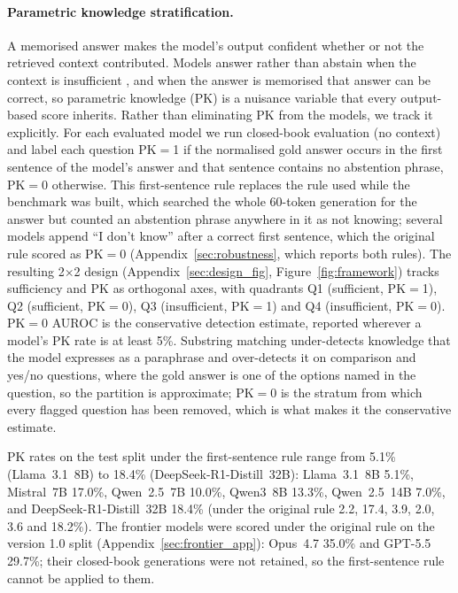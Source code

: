 \documentclass[acmsmall,screen,review]{acmart}
\begin{document}
\paragraph{Parametric knowledge stratification.}
A memorised answer makes the model's output confident whether or not the retrieved context contributed. Models answer rather than abstain when the context is insufficient \citep{joren2025sufficient}, and when the answer is memorised that answer can be correct, so parametric knowledge (PK) is a nuisance variable that every output-based score inherits. Rather than eliminating PK from the models, we track it explicitly. For each evaluated model we run closed-book evaluation (no context) and label each question PK$=$1 if the normalised gold answer occurs in the first sentence of the model's answer and that sentence contains no abstention phrase, PK$=$0 otherwise. This first-sentence rule replaces the rule used while the benchmark was built, which searched the whole 60-token generation for the answer but counted an abstention phrase anywhere in it as not knowing; several models append ``I don't know'' after a correct first sentence, which the original rule scored as PK$=$0 (Appendix~\ref{sec:robustness}, which reports both rules). The resulting 2$\times$2 design (Appendix~\ref{sec:design_fig}, Figure~\ref{fig:framework}) tracks sufficiency and PK as orthogonal axes, with quadrants Q1 (sufficient, PK$=$1), Q2 (sufficient, PK$=$0), Q3 (insufficient, PK$=$1) and Q4 (insufficient, PK$=$0). PK$=$0 AUROC is the conservative detection estimate, reported wherever a model's PK rate is at least 5\%. Substring matching under-detects knowledge that the model expresses as a paraphrase and over-detects it on comparison and yes/no questions, where the gold answer is one of the options named in the question, so the partition is approximate; PK$=$0 is the stratum from which every flagged question has been removed, which is what makes it the conservative estimate.

PK rates on the test split under the first-sentence rule range from 5.1\% (Llama~3.1~8B) to 18.4\% (DeepSeek-R1-Distill~32B): Llama~3.1~8B 5.1\%, Mistral~7B 17.0\%, Qwen~2.5~7B 10.0\%, Qwen3~8B 13.3\%, Qwen~2.5~14B 7.0\%, and DeepSeek-R1-Distill~32B 18.4\% (under the original rule 2.2, 17.4, 3.9, 2.0, 3.6 and 18.2\%). The frontier models were scored under the original rule on the version 1.0 split (Appendix~\ref{sec:frontier_app}): Opus~4.7 35.0\% and GPT-5.5 29.7\%; their closed-book generations were not retained, so the first-sentence rule cannot be applied to them.
\end{document}
